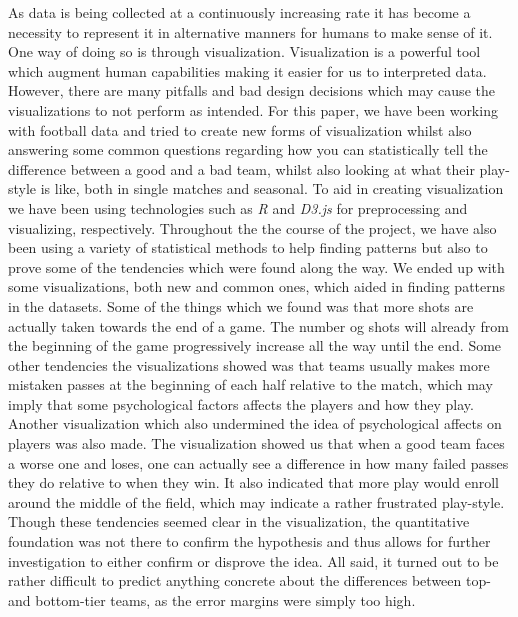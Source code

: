 \documentclass[Report.tex]{subfiles}
\begin{document}
 
As data is being collected at a continuously increasing rate it has become a necessity to represent it in alternative manners for humans to make sense of it. One way of doing so is through visualization. Visualization is a powerful tool which augment human capabilities making it easier for us to interpreted data. However, there are many pitfalls and bad design decisions which may cause the visualizations to not perform as intended. For this paper, we have been working with football data and tried to create new forms of visualization whilst also answering some common questions regarding how you can statistically tell the difference between a good and a bad team, whilst also looking at what their play-style is like, both in single matches and seasonal. To aid in creating visualization we have been using technologies such as \textit{R} and \textit{D3.js} for preprocessing and visualizing, respectively. Throughout the the course of the project, we have also been using a variety of statistical methods to help finding patterns but also to prove some of the tendencies which were found along the way. We ended up with some visualizations, both new and common ones, which aided in finding patterns in the datasets. Some of the things which we found was that more shots are actually taken towards the end of a game. The number og shots will already from the beginning of the game progressively increase all the way until the end. Some other tendencies the visualizations showed was that teams usually makes more mistaken passes at the beginning of each half relative to the match, which may imply that some psychological factors affects the players and how they play. Another visualization which also undermined the idea of psychological affects on players was also made. The visualization showed us that when a good team faces a worse one and loses, one can actually see a difference in how many failed passes they do relative to when they win. It also indicated that more play would enroll around the middle of the field, which may indicate a rather frustrated play-style. Though these tendencies seemed clear in the visualization, the quantitative foundation was not there to confirm the hypothesis and thus allows for further investigation to either confirm or disprove the idea. All said, it turned out to be rather difficult to predict anything concrete about the differences between top- and bottom-tier teams, as the error margins were simply too high.
\end{document}
